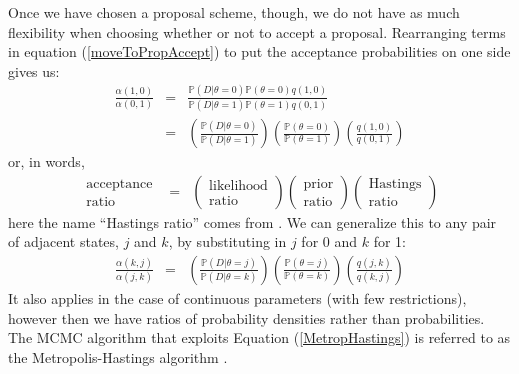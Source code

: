 \documentclass[11pt]{article}
\newcommand{\prop}[2]{q(#1,#2)}
\newcommand{\accept}[2]{\alpha({#1,#2})}
\renewcommand{\Pr}{{\mathbb P}}
\begin{document}
Once we have chosen a proposal scheme, though, we do not have as much flexibility when choosing whether or not to accept a proposal.
Rearranging terms in equation (\ref{moveToPropAccept}) to put the acceptance probabilities on one side gives us:
\begin{eqnarray*}
	 \frac{\accept{1}{0}}{\accept{0}{1}} &  = & \frac{\Pr(D|\theta=0)\Pr(\theta=0)\prop{1}{0}}{\Pr(D|\theta=1)\Pr(\theta=1)\prop{0}{1}} \\
	 	& = & \left(\frac{\Pr(D|\theta=0)}{\Pr(D|\theta=1)}\right)\left(\frac{\Pr(\theta=0)}{\Pr(\theta=1)}\right)\left(\frac{\prop{1}{0}}{\prop{0}{1}}\right) \label{MetropHastings}
\end{eqnarray*}
or, in words,
\begin{eqnarray}
	\begin{array}{c} \mbox{acceptance} \\ \mbox{ratio} \end{array} & = & 
		\left(\begin{array}{c} {\mbox{likelihood}} \\ {\mbox{ratio}} \end{array}\right)
		\left(\begin{array}{c} {\mbox{prior}} \\ {\mbox{ratio}} \end{array}\right)
		\left(\begin{array}{c} {\mbox{Hastings}} \\ {\mbox{ratio}} \end{array}\right)
\end{eqnarray}
here the name ``Hastings ratio'' comes from \citet{Hastings1970}.
We can generalize this to any pair of adjacent states, $j$ and $k$, by substituting in $j$ for 0 and $k$ for 1:
\begin{eqnarray}
	 \frac{\accept{k}{j}}{\accept{j}{k}} & = & \left(\frac{\Pr(D|\theta=j)}{\Pr(D|\theta=k)}\right)\left(\frac{\Pr(\theta=j)}{\Pr(\theta=k)}\right)\left(\frac{\prop{j}{k}}{\prop{k}{j}}\right) \label{MetropHastings}
\end{eqnarray}
It also applies in the case of continuous parameters (with few restrictions), however then we have ratios of probability densities rather than probabilities.
The MCMC algorithm that exploits Equation (\ref{MetropHastings}) is referred to as the Metropolis-Hastings algorithm \citep{MetropolisRRTT1953}.
\end{document}
